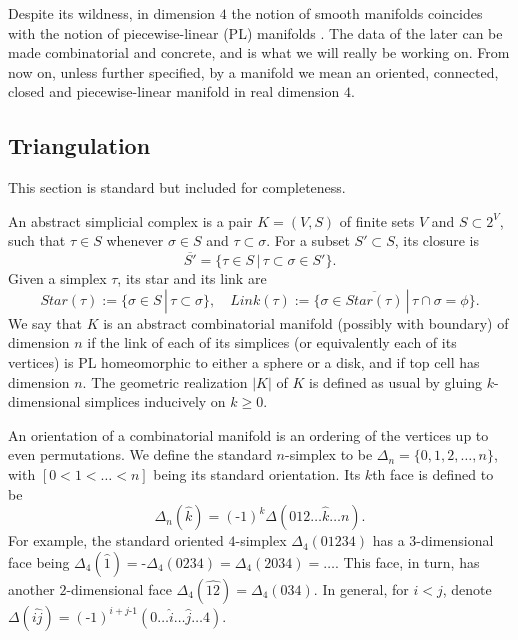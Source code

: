 \noindent Despite its wildness, in dimension $4$ the notion of
smooth manifolds coincides with the notion of piecewise-linear
(PL) manifolds \cite[sec.IX.1.1]{turaev-qiok-3-manifolds}. The
data of the later can be made combinatorial and concrete, and is
what we will really be working on. From now on, unless further
specified, by a manifold we mean an oriented, connected, closed
and piecewise-linear manifold in real dimension $4$.

\subsection{Triangulation} \label{subsection/triangulation}

This section is standard
\cite[chap.1]{rourke-sanderson/intro-to-pl-topology}
\cite[sec.2]{manolescu/lectures-on-the-triangulation-conjecture}
but included for completeness.

\begin{definition}\label{def/simplicial-complex}
  An abstract simplicial complex is a pair $K = (V, S)$ of finite
  sets $V$ and $S \subset 2^{V}$, such that $\tau \in S$ whenever
  $\sigma \in S$ and $\tau \subset \sigma$. For a subset
  $S' \subset S$, its closure is
  $$\overline{S'} = \{\tau \in S \,|\, \tau \subset \sigma \in S'\}.$$
  Given a simplex $\tau$, its star and its link are
  $$Star(\tau) := \{\sigma \in S \,|\, \tau \subset \sigma\}, \quad
  Link(\tau) := \{\sigma \in \overline{Star(\tau)} \,|\, \tau \cap \sigma = \phi\}.$$
  We say that $K$ is an abstract combinatorial manifold (possibly
  with boundary) of dimension $n$ if the link of each of its
  simplices (or equivalently each of its vertices) is PL
  homeomorphic to either a sphere or a disk, and if top cell has
  dimension $n$. The geometric realization $|K|$ of $K$ is
  defined as usual by gluing $k$-dimensional simplices inducively
  on $k \geq 0$.

  An orientation of a combinatorial manifold is an ordering of
  the vertices up to even permutations. We define the standard
  $n$-simplex to be $\Delta_{n} = \{0, 1, 2, \ldots, n\}$, with
  $[0 < 1 < \ldots < n]$ being its standard orientation. Its
  $k$th face is defined to be
  $$\Delta_{n}(\widehat{k}) = (\text{-} 1)^{k}\Delta(012 \ldots \widehat{k} \ldots n).$$
  For example, the standard oriented $4$-simplex
  $\Delta_{4}(01234)$ has a $3$-dimensional face being
  $\Delta_{4}(\widehat{1}) = \text{-} \Delta_{4}(0234) = \Delta_{4}(2034) = \ldots$.
  This face, in turn, has another $2$-dimensional face
  $\Delta_{4}(\widehat{12}) = \Delta_{4}(034)$. In general, for
  $i<j$, denote
  $\Delta(\widehat{ij}) = (\text{-} 1)^{i+j \text{-} 1}(0 \ldots \widehat{i} \ldots \widehat{j} \ldots 4)$.
\end{definition}

